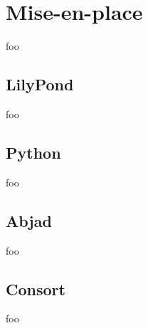 \chapter{Mise-en-place}

foo

\section{LilyPond}

foo

\section{Python}

foo

\section{Abjad}

foo

\section{Consort}

foo